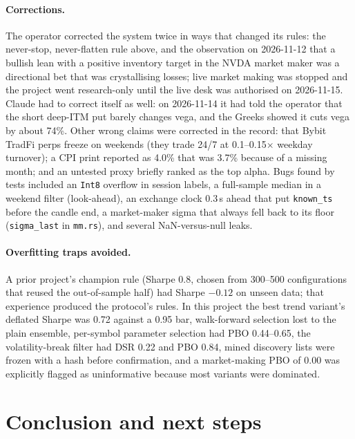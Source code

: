\documentclass[10pt,a4paper]{article}
\begin{document}
\paragraph{Corrections.} The operator corrected the system twice in ways that changed its rules: the never-stop, never-flatten rule above, and the observation on 2026-11-12 that a bullish lean with a positive inventory target in the NVDA market maker was a directional bet that was crystallising losses; live market making was stopped and the project went research-only until the live desk was authorised on 2026-11-15. Claude had to correct itself as well: on 2026-11-14 it had told the operator that the short deep-ITM put barely changes vega, and the Greeks showed it cuts vega by about 74\%. Other wrong claims were corrected in the record: that Bybit TradFi perps freeze on weekends (they trade 24/7 at 0.1--0.15$\times$ weekday turnover); a CPI print reported as 4.0\% that was 3.7\% because of a missing month; and an untested proxy briefly ranked as the top alpha. Bugs found by tests included an \texttt{Int8} overflow in session labels, a full-sample median in a weekend filter (look-ahead), an exchange clock 0.3\,s ahead that put \texttt{known\_ts} before the candle end, a market-maker sigma that always fell back to its floor (\texttt{sigma\_last} in \texttt{mm.rs}), and several NaN-versus-null leaks.

\paragraph{Overfitting traps avoided.} A prior project's champion rule (Sharpe 0.8, chosen from 300--500 configurations that reused the out-of-sample half) had Sharpe $-0.12$ on unseen data; that experience produced the protocol's rules. In this project the best trend variant's deflated Sharpe was 0.72 against a 0.95 bar, walk-forward selection lost to the plain ensemble, per-symbol parameter selection had PBO 0.44--0.65, the volatility-break filter had DSR 0.22 and PBO 0.84, mined discovery lists were frozen with a hash before confirmation, and a market-making PBO of 0.00 was explicitly flagged as uninformative because most variants were dominated.

\section{Conclusion and next steps}
\end{document}
